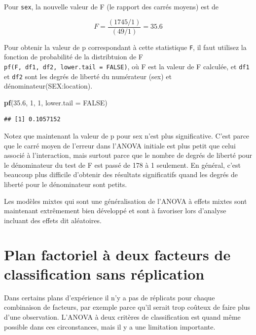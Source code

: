 \documentclass[12pt,]{book}
\makeatletter
\newenvironment{Shaded}{\begin{snugshade}}{\end{snugshade}}
\newcommand{\DataTypeTok}[1]{\textcolor[rgb]{0.27,0.27,0.27}{#1}}
\newcommand{\DecValTok}[1]{\textcolor[rgb]{0.06,0.06,0.06}{#1}}
\newcommand{\FloatTok}[1]{\textcolor[rgb]{0.06,0.06,0.06}{#1}}
\newcommand{\KeywordTok}[1]{\textcolor[rgb]{0.27,0.27,0.27}{\textbf{#1}}}
\newcommand{\NormalTok}[1]{#1}
\newcommand{\OtherTok}[1]{\textcolor[rgb]{0.37,0.37,0.37}{#1}}
\newenvironment{kframe}{%
\medskip{}
\setlength{\fboxsep}{.8em}
 \def\at@end@of@kframe{}%
 \ifinner\ifhmode%
  \def\at@end@of@kframe{\end{minipage}}%
  \begin{minipage}{\columnwidth}%
 \fi\fi%
 \def\FrameCommand##1{\hskip\@totalleftmargin \hskip-\fboxsep
 \colorbox{shadecolor}{##1}\hskip-\fboxsep
     \hskip-\linewidth \hskip-\@totalleftmargin \hskip\columnwidth}%
 \MakeFramed {\advance\hsize-\width
   \@totalleftmargin\z@ \linewidth\hsize
   \@setminipage}}%
 {\par\unskip\endMakeFramed%
 \at@end@of@kframe}
\newenvironment{rmdblock}[1]
  {
  \begin{itemize}
  \renewcommand{\labelitemi}{
    \raisebox{-.7\height}[0pt][0pt]{
      {\setkeys{Gin}{width=3em,keepaspectratio}\texttt{[image: images/\#1]}}
    }
  }
  \setlength{\fboxsep}{1em}
  \begin{kframe}
  \item
  }
  {
  \end{kframe}
  \end{itemize}
  }
\newenvironment{rmdnote}
  {\begin{rmdblock}{note}}
  {\end{rmdblock}}
\makeatother
\begin{document}
Pour \texttt{sex}, la nouvelle valeur de F (le rapport des carrés moyens) est de

\[F = \frac{(1745/1)}{(49/1)} = 35.6\]

Pour obtenir la valeur de p correspondant à cette statistique \texttt{F}, il faut utilisez la fonction de probabilité de la distribtuion de F \texttt{pf(F,\ df1,\ df2,\ lower.tail\ =\ FALSE)}, où F est la valeur de F calculée, et \texttt{df1} et \texttt{df2} sont les degrés de liberté du numérateur (sex) et dénominateur(SEX:location).

\begin{Shaded}
\begin{Highlighting}[]
\KeywordTok{pf}\NormalTok{(}\FloatTok{35.6}\NormalTok{, }\DecValTok{1}\NormalTok{, }\DecValTok{1}\NormalTok{, }\DataTypeTok{lower.tail =}  \OtherTok{FALSE}\NormalTok{)}
\end{Highlighting}
\end{Shaded}

\begin{verbatim}
## [1] 0.1057152
\end{verbatim}

Notez que maintenant la valeur de p pour sex n'est plus significative. C'est parce que le carré moyen de l'erreur dans l'ANOVA initiale est plus petit que celui associé à l'interaction, mais surtout parce que le nombre de degrés de liberté pour le dénominateur du test de F est passé de 178 à 1 seulement. En général, c'est beaucoup plus difficile d'obtenir des résultats significatifs quand les degrés de liberté pour le dénominateur sont petits.

\begin{rmdnote}
Les modèles mixtes qui sont une généralisation de l'ANOVA à effets mixtes sont maintenant extrêmement bien développé et sont à favoriser lors d'analyse incluant des effets dit aléatoires.
\end{rmdnote}

\hypertarget{plan-factoriel-uxe0-deux-facteurs-de-classification-sans-ruxe9plication}{%
\section{Plan factoriel à deux facteurs de classification sans réplication}\label{plan-factoriel-uxe0-deux-facteurs-de-classification-sans-ruxe9plication}}

Dans certains plans d'expérience il n'y a pas de réplicats pour chaque combinaison de facteurs, par exemple parce qu'il serait trop coûteux de faire plus d'une observation. L'ANOVA à deux critères de classification est quand même possible dans ces circonstances, mais il y a une limitation importante.
\end{document}
